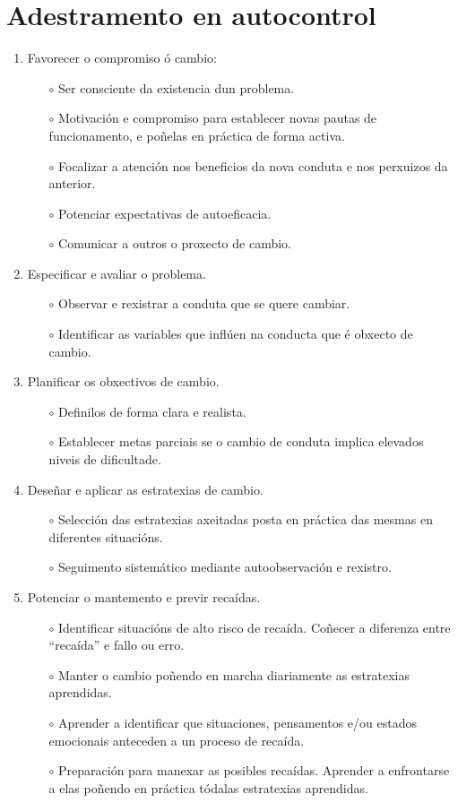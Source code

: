 \documentclass[a4paper,11pt]{article}
\begin{document}
\section{Adestramento en autocontrol}
\begin{enumerate}
	\item Favorecer o compromiso ó cambio:
	\begin{itemize}
		\item[$\circ$] Ser consciente da existencia dun problema.
		\item[$\circ$] Motivación e compromiso para establecer novas pautas de funcionamento, e 
		poñelas en práctica de forma activa.
		\item[$\circ$] Focalizar a atención nos beneficios da nova conduta e nos perxuizos da 
		anterior.
		\item[$\circ$] Potenciar expectativas de autoeficacia.
		\item[$\circ$] Comunicar a outros o proxecto de cambio.
	\end{itemize}
	\item Especificar e avaliar o problema.
	\begin{itemize}
		\item[$\circ$] Observar e rexistrar a conduta que se quere cambiar.
		\item[$\circ$] Identificar as variables que inflúen na conducta que é obxecto de cambio.
	\end{itemize}
	\item Planificar os obxectivos de cambio.
	\begin{itemize}
		\item[$\circ$] Definilos de forma clara e realista.
		\item[$\circ$] Establecer metas parciais se o cambio de conduta implica elevados niveis de 
		dificultade.
	\end{itemize}
	\item Deseñar e aplicar as estratexias de cambio.
	\begin{itemize}
		\item[$\circ$] Selección das estratexias axeitadas posta en práctica das mesmas en diferentes 
		situacións.
		\item[$\circ$] Seguimento sistemático mediante autoobservación e rexistro.
	\end{itemize}
	\item Potenciar o mantemento e previr recaídas.
	\begin{itemize}
		\item[$\circ$] Identificar situacións de alto risco de recaída. Coñecer a diferenza entre 
		``recaída'' e fallo ou erro.
		\item[$\circ$] Manter o cambio poñendo en marcha diariamente as estratexias aprendidas.
		\item[$\circ$] Aprender a identificar que situaciones, pensamentos e/ou estados emocionais 
		anteceden a un proceso de recaída.
		\item[$\circ$] Preparación para manexar as posibles recaídas. Aprender a enfrontarse a elas 
		poñendo en práctica tódalas estratexias aprendidas.
	\end{itemize}
\end{enumerate}
\end{document}
